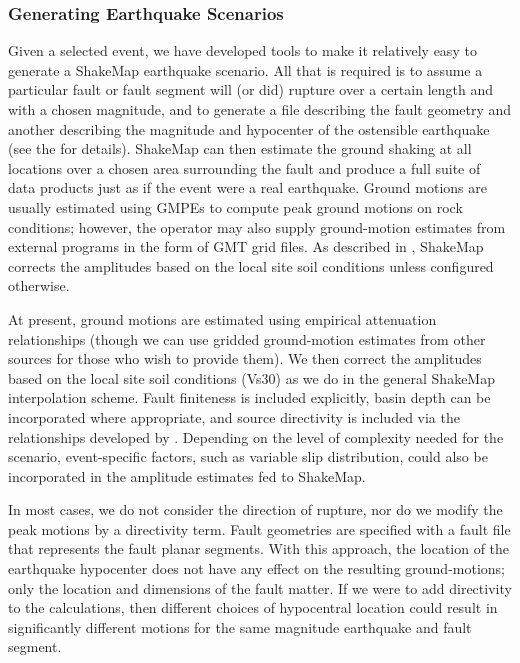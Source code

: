 \documentclass[letterpaper,10pt,english]{sphinxmanual}
\begin{document}
\subsubsection{Generating Earthquake Scenarios}
\label{shakemap_archives:generating-earthquake-scenarios}
Given a selected event, we have developed tools to make it relatively easy to generate a
ShakeMap earthquake scenario. All that is required is to assume a particular fault or fault
segment will (or did) rupture over a certain length and with a chosen magnitude, and to
generate a file describing the fault geometry and another describing the magnitude and
hypocenter of the ostensible earthquake (see the {\hyperref[software_guide:software\string-guide]{}} for details). ShakeMap
can then estimate the ground shaking at all locations over a chosen area surrounding the
fault and produce a full suite of data products just as if the event were a real earthquake.
Ground motions are usually estimated using GMPEs to compute peak ground motions on
rock conditions; however, the operator may also supply ground-motion estimates from
external programs in the form of GMT grid files. As described in {\hyperref[tg_processing:amplify\string-ground\string-motions]{}},
ShakeMap corrects the amplitudes based on the local site soil conditions unless
configured otherwise.

At present, ground motions are estimated using empirical attenuation
relationships (though we can use gridded ground-motion estimates from other
sources for those who wish to provide them). We then correct the amplitudes
based on the local site soil conditions (Vs30) as we do in the general ShakeMap
interpolation scheme.  Fault finiteness is included explicitly, basin depth can
be incorporated where appropriate, and source directivity is included via the
relationships developed by {\hyperref[references:rowshandel2010]{}}.  Depending on the level of
complexity needed for the scenario, event-specific factors, such as variable
slip distribution, could also be incorporated in the amplitude estimates fed to
ShakeMap.

In most cases, we do not consider the direction of rupture, nor do we modify the peak
motions by a directivity term. Fault geometries are specified with a fault file that
represents the fault planar segments. With this approach, the location of
the earthquake hypocenter does not have any effect on the resulting ground-motions; only
the location and dimensions of the fault matter. If we were to add directivity to the
calculations, then different choices of hypocentral location could result in significantly
different motions for the same magnitude earthquake and fault segment.
\end{document}
